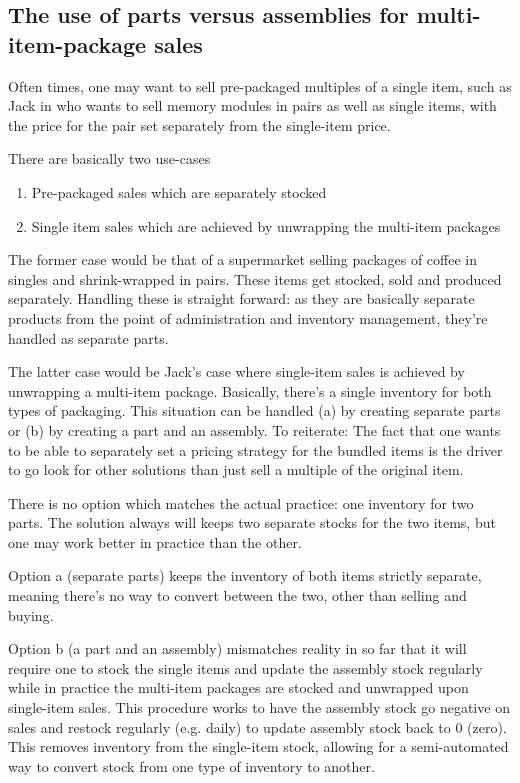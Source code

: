 \subsection{The use of parts versus assemblies for multi-item-package sales}
\label{subsec-parts-versus-assemblies}

Often times, one may want to sell pre-packaged multiples of a single item, such as Jack
in  who wants to sell memory modules in pairs as well as
single items, with the price for the pair set separately from the single-item price.

There are basically two use-cases

\begin{enumerate}
\item Pre-packaged sales which are separately stocked
\item Single item sales which are achieved by unwrapping the multi-item packages
\end{enumerate}

The former case would be that of a supermarket selling packages of coffee in
singles and shrink-wrapped in pairs. These items get stocked, sold and produced separately.
Handling these is straight forward: as they are basically separate products from the point
of administration and inventory management, they're handled as separate parts.

The latter case would be Jack's case where single-item sales is achieved by unwrapping
a multi-item package. Basically, there's a single inventory for both types of packaging.
This situation can be handled (a) by creating separate parts or (b) by creating a part and an
assembly.
To reiterate: The fact that one wants to be able to separately set a pricing strategy
for the bundled items is the driver to go look for other solutions than just sell a
multiple of the original item.

There is no option which matches the actual practice: one inventory for two parts. The solution
always will keeps two separate stocks for the two items, but one may work better in practice
than the other.

Option a (separate parts) keeps the inventory of both items strictly separate,
meaning there's no way to convert between the two, other than selling and buying.

Option b (a part and an assembly) mismatches reality in so far that it will require one
to stock the single items and update the assembly stock regularly while in practice the
multi-item packages are stocked and unwrapped upon single-item sales. This procedure works
to have the assembly stock go negative on sales and restock regularly (e.g. daily) to
update assembly stock back to 0 (zero). This removes inventory from the single-item stock,
allowing for a semi-automated way to convert stock from one type of inventory to another.


